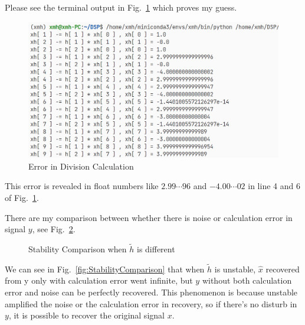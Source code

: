 \documentclass{article}
\begin{document}
Please see the terminal output in Fig.~\ref{fig:CalculationError} which proves my guess.
\begin{figure}[!h]
	\centering
	\includegraphics[width=3 in]{../pic/CalculationError.png}
	\caption{Error in Division Calculation}
	\label{fig:CalculationError}
\end{figure}

This error is revealed in float numbers like $2.99\cdots96$ and $-4.00\cdots02$ in line 4 and 6 of Fig.~\ref{fig:CalculationError}.

There are my comparison between whether there is noise or calculation error in signal $y$, see Fig.~\ref{fig:Comparison}.
\begin{figure}[!h]
	\centering
	\hspace{0 pt}
	\caption{Stability Comparison when $\tilde{h}$ is different}
	\label{fig:Comparison}
\end{figure}

We can see in Fig.~\ref{fig:StabilityComparison} that when $\tilde{h}$ is unstable, $\hat{x}$ recovered from y only with calculation error went infinite, but $y$ without both calculation error and noise can be perfectly recovered. This phenomenon is because unstable amplified the noise or the calculation error in recovery, so if there's no disturb in $y$, it is possible to recover the original signal $x$.
\end{document}
